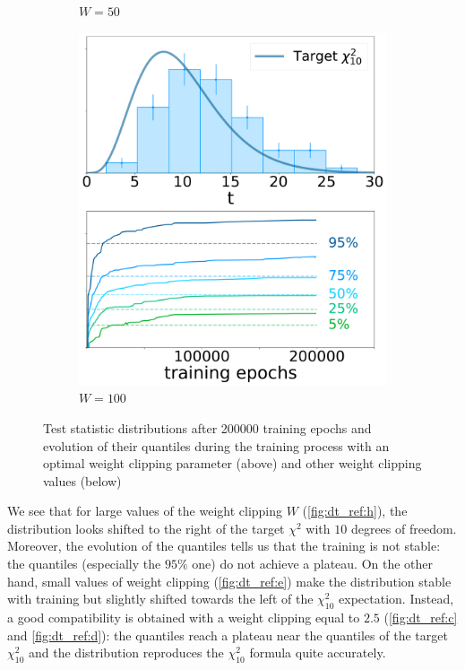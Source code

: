 \begin{figure}[h]
\begin{subfigure}[b]{0.25\textwidth}
        \caption{$W=50$}
        \label{fig:dt_ref:g}
    \end{subfigure}%
    \begin{subfigure}[b]{0.25\textwidth}
        \centering 
        \includegraphics[width=1.0\textwidth]{../PLOTS/DRIFT_TIME/thesis/both_100_0.pdf}
        \caption{$W=100$}
        \label{fig:dt_ref:h}
    \end{subfigure}%
    \caption{Test statistic distributions after 200000 training epochs and evolution of their quantiles during the
    training process with an optimal weight clipping parameter (above) and other weight clipping values (below)}
    \label{fig:dt_ref}
\end{figure}

We see that for large values of the weight clipping $W$ (\autoref{fig:dt_ref:h}), the distribution looks shifted to the
right of the target $\chi^2$ with $10$ degrees of freedom. Moreover, the evolution of the quantiles tells us that the
training is not stable: the quantiles (especially the $95\%$ one) do not achieve a plateau. On the other hand, small
values of weight clipping (\autoref{fig:dt_ref:e}) make the distribution stable with training but slightly shifted
towards the left of the $\chi^2_{10}$ expectation. Instead, a good compatibility is obtained with a weight clipping
equal to $2.5$ (\autoref{fig:dt_ref:c} and \autoref{fig:dt_ref:d}): the quantiles reach a plateau near the quantiles of
the target $\chi^2_{10}$ and the distribution reproduces the $\chi^2_{10}$ formula quite accurately. 

